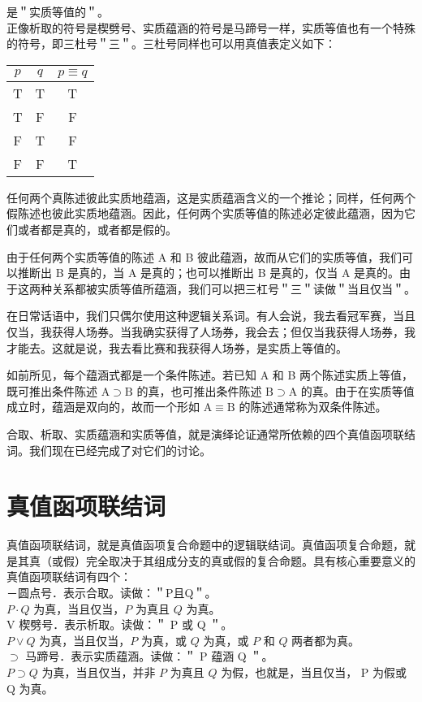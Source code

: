 是＂实质等值的＂。\\
正像析取的符号是楔劈号、实质蕴涵的符号是马蹄号一样，实质等值也有一个特殊的符号，即三杜号＂三＂。三杜号同样也可以用真值表定义如下：

\begin{center}
\begin{tabular}{|ccc|}
\hline
$p$ & $q$ & $p \equiv q$ \\
\hline
T & T & T \\
T & F & F \\
F & T & F \\
F & F & T \\
\hline
\end{tabular}
\end{center}

任何两个真陈述彼此实质地蕴涵，这是实质蕴涵含义的一个推论；同样，任何两个假陈述也彼此实质地蕴涵。因此，任何两个实质等值的陈述必定彼此蕴涵，因为它们或者都是真的，或者都是假的。

由于任何两个实质等值的陈述 A 和 B 彼此蕴涵，故而从它们的实质等值，我们可以推断出 B 是真的，当 A 是真的；也可以推断出 B 是真的，仅当 A 是真的。由于这两种关系都被实质等值所蕴涵，我们可以把三杠号＂三＂读做＂当且仅当＂。

在日常话语中，我们只偶尔使用这种逻辑关系词。有人会说，我去看冠军赛，当且仅当，我获得人场券。当我确实获得了人场券，我会去；但仅当我获得人场券，我才能去。这就是说，我去看比赛和我获得人场券，是实质上等值的。

如前所见，每个蕴涵式都是一个条件陈述。若已知 A 和 B 两个陈述实质上等值，既可推出条件陈述 $\mathrm{A} \supset \mathrm{B}$ 的真，也可推出条件陈述 $\mathrm{B} \supset \mathrm{A}$ 的真。由于在实质等值成立时，蕴涵是双向的，故而一个形如 $\mathrm{A} \equiv \mathrm{B}$ 的陈述通常称为双条件陈述。

合取、析取、实质蕴涵和实质等值，就是演绎论证通常所依赖的四个真值函项联结词。我们现在已经完成了对它们的讨论。

\section*{真值函项联结词}
真值函项联结词，就是真值函项复合命题中的逻辑联结词。真值函项复合命题，就是其真（或假）完全取决于其组成分支的真或假的复合命题。具有核心重要意义的真值函项联结词有四个：\\
－圆点号．表示合取。读做：＂P且Q＂。\\
$P \cdot Q$ 为真，当且仅当，$P$ 为真且 $Q$ 为真。\\
V 楔劈号．表示析取。读做：＂ P 或 Q ＂。\\
$P \vee Q$ 为真，当且仅当，$P$ 为真，或 $Q$ 为真，或 $P$ 和 $Q$ 两者都为真。\\
$\supset$ 马蹄号．表示实质蕴涵。读做：＂ P 蕴涵 Q ＂。\\
$P \supset Q$ 为真，当且仅当，并非 $P$ 为真且 $Q$ 为假，也就是，当且仅当， P 为假或 Q 为真。

